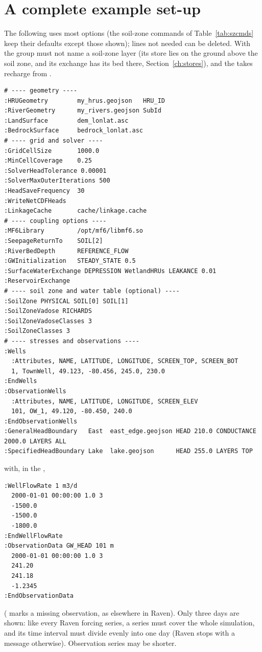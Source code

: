 \section{A complete example set-up}
The following  uses most options (the soil-zone commands of Table~\ref{tab:szcmds} keep their defaults except those shown); lines not needed can be deleted. With  the  group must not name a soil-zone layer (its  store lies on the ground above the soil zone, and its exchange has its bed there, Section~\ref{ch:stores}), and the  takes recharge from .
\begin{lstlisting}
# ---- geometry ----
:HRUGeometry        my_hrus.geojson   HRU_ID
:RiverGeometry      my_rivers.geojson SubId
:LandSurface        dem_lonlat.asc
:BedrockSurface     bedrock_lonlat.asc
# ---- grid and solver ----
:GridCellSize       1000.0
:MinCellCoverage    0.25
:SolverHeadTolerance 0.00001
:SolverMaxOuterIterations 500
:HeadSaveFrequency  30
:WriteNetCDFHeads
:LinkageCache       cache/linkage.cache
# ---- coupling options ----
:MF6Library         /opt/mf6/libmf6.so
:SeepageReturnTo    SOIL[2]
:RiverBedDepth      REFERENCE_FLOW
:GWInitialization   STEADY_STATE 0.5
:SurfaceWaterExchange DEPRESSION WetlandHRUs LEAKANCE 0.01
:ReservoirExchange
# ---- soil zone and water table (optional) ----
:SoilZone PHYSICAL SOIL[0] SOIL[1]
:SoilZoneVadose RICHARDS
:SoilZoneVadoseClasses 3
:SoilZoneClasses 3
# ---- stresses and observations ----
:Wells
  :Attributes, NAME, LATITUDE, LONGITUDE, SCREEN_TOP, SCREEN_BOT
  1, TownWell, 49.123, -80.456, 245.0, 230.0
:EndWells
:ObservationWells
  :Attributes, NAME, LATITUDE, LONGITUDE, SCREEN_ELEV
  101, OW_1, 49.120, -80.450, 240.0
:EndObservationWells
:GeneralHeadBoundary   East  east_edge.geojson HEAD 210.0 CONDUCTANCE 2000.0 LAYERS ALL
:SpecifiedHeadBoundary Lake  lake.geojson      HEAD 255.0 LAYERS TOP
\end{lstlisting}
with, in the ,
\begin{lstlisting}
:WellFlowRate 1 m3/d
  2000-01-01 00:00:00 1.0 3
  -1500.0
  -1500.0
  -1800.0
:EndWellFlowRate
:ObservationData GW_HEAD 101 m
  2000-01-01 00:00:00 1.0 3
  241.20
  241.18
  -1.2345
:EndObservationData
\end{lstlisting}
( marks a missing observation, as elsewhere in Raven). Only three days are shown: like every Raven
forcing series, a  series must cover the whole simulation, and its time interval must divide evenly
into one day (Raven stops with a message otherwise). Observation series may be shorter.
